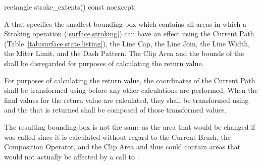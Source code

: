 \begin{itemdecl}
rectangle stroke_extents() const noexcept;
\end{itemdecl}
\begin{itemdescr}
\pnum
\returns
A  that specifies the smallest bounding box which contains all areas in which a Stroking operation (\ref{surface.stroking}) can have an effect using the Current Path (Table~\ref{tab:surface.state.listing}), the Line Cap, the Line Join, the Line Width, the Miter Limit, and the Dash Pattern. The Clip Area and the bounds of the \underlyingsurface shall be disregarded for purposes of calculating the return value.

\pnum
For purposes of calculating the return value, the coordinates of the Current Path shall be transformed using  before any other calculations are performed. When the final values for the return value are calculated, they shall be transformed using  and the  that is returned shall be composed of those transformed values.

\pnum
\realnotes
The resulting bounding box is not the same as the area that would be changed if  was called since it is calculated without regard to the Current Brush, the Composition Operator, and the Clip Area and thus could contain areas that would not actually be affected by a call to .
\end{itemdescr}

